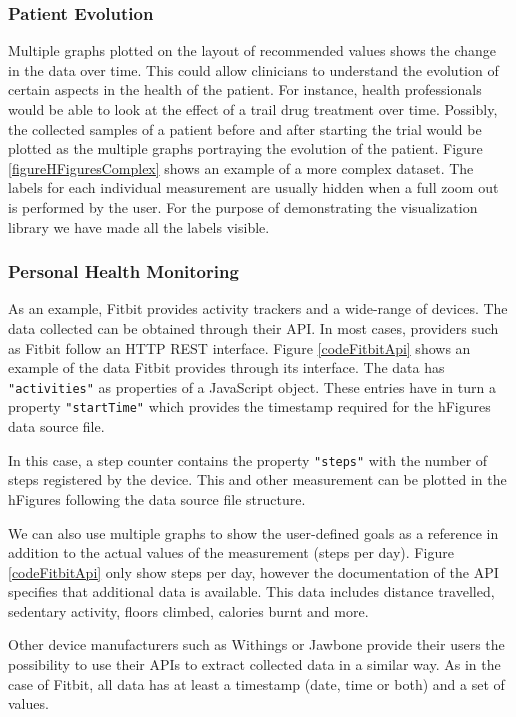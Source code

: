 \documentclass[twocolumn]{bmcart}%
\begin{document}
\subsubsection*{Patient Evolution}

Multiple graphs plotted on the layout of recommended values shows the change in the data over time. This could allow clinicians to understand the evolution of certain aspects in the health of the patient. For instance, health professionals would be able to look at the effect of a trail drug treatment over time. Possibly, the collected samples of a patient before and after starting the trial would be plotted as the multiple graphs portraying the evolution of the patient. Figure \ref{figureHFiguresComplex} shows an example of a more complex dataset. The labels for each individual measurement are usually hidden when a full zoom out is performed by the user. For the purpose of demonstrating the visualization library we have made all the labels visible. 


\subsubsection*{Personal Health Monitoring}

As an example, Fitbit provides activity trackers and a wide-range of devices. The data collected can be obtained through their API. In most cases, providers such as Fitbit follow an HTTP REST interface. Figure \ref{codeFitbitApi} shows an example of the data Fitbit provides through its interface. The data has \texttt{"activities"} as properties of a JavaScript object. These entries have in turn a property \texttt{"startTime"} which provides the timestamp required for the hFigures data source file.

In this case, a step counter contains the property \texttt{"steps"} with the number of steps registered by the device. This and other measurement can be plotted in the hFigures following the data source file structure.

We can also use multiple graphs to show the user-defined goals as a reference in addition to the actual values of the measurement (steps per day). Figure \ref{codeFitbitApi} only show steps per day, however the documentation of the API specifies that additional data is available. This data includes distance travelled, sedentary activity, floors climbed, calories burnt and more.

Other device manufacturers such as Withings or Jawbone provide their users the possibility to use their APIs to extract collected data in a similar way. As in the case of Fitbit, all data has at least a timestamp (date, time or both) and a set of values.
\end{document}
